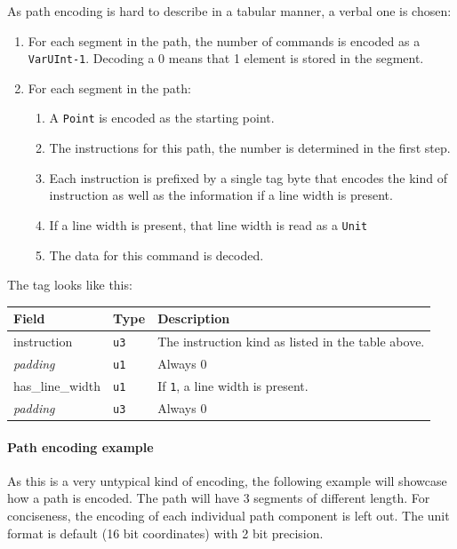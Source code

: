 \documentclass[]{article}
\providecommand{\tightlist}{%
  \setlength{\itemsep}{0pt}\setlength{\parskip}{0pt}}
\begin{document}
As path encoding is hard to describe in a tabular manner, a verbal one
is chosen:

\begin{enumerate}
\def\labelenumi{\arabic{enumi}.}
\tightlist
\item
  For each segment in the path, the number of commands is encoded as a
  \texttt{VarUInt-1}. Decoding a 0 means that 1 element is stored in the segment.
\item
  For each segment in the path:

  \begin{enumerate}
  \def\labelenumii{\arabic{enumii}.}
  \tightlist
  \item
    A \texttt{Point} is encoded as the starting point.
  \item
    The instructions for this path, the number is determined in the
    first step.
  \item
    Each instruction is prefixed by a single tag byte that encodes the
    kind of instruction as well as the information if a line width is
    present.
  \item
    If a line width is present, that line width is read as a
    \texttt{Unit}
  \item
    The data for this command is decoded.
  \end{enumerate}
\end{enumerate}

The tag looks like this:

\begin{longtable}[]{@{}p{1in}p{0.5in}p{4.5in}@{}}
\toprule
Field & Type & Description \\
\midrule
\endhead
instruction & \texttt{u3} & The instruction kind as listed in the table above. \\
\emph{padding} & \texttt{u1} & Always 0 \\
has\_line\_width & \texttt{u1} & If \texttt{1}, a line width is present. \\
\emph{padding} & \texttt{u3} & Always 0 \\
\bottomrule
\end{longtable}

\paragraph{Path encoding example} As this is a very untypical kind of encoding, the following example will showcase how a path is encoded. The path will have 3 segments of different length. For conciseness, the encoding of each individual path component is left out. The unit format is default (16 bit coordinates) with 2 bit precision.
\end{document}
